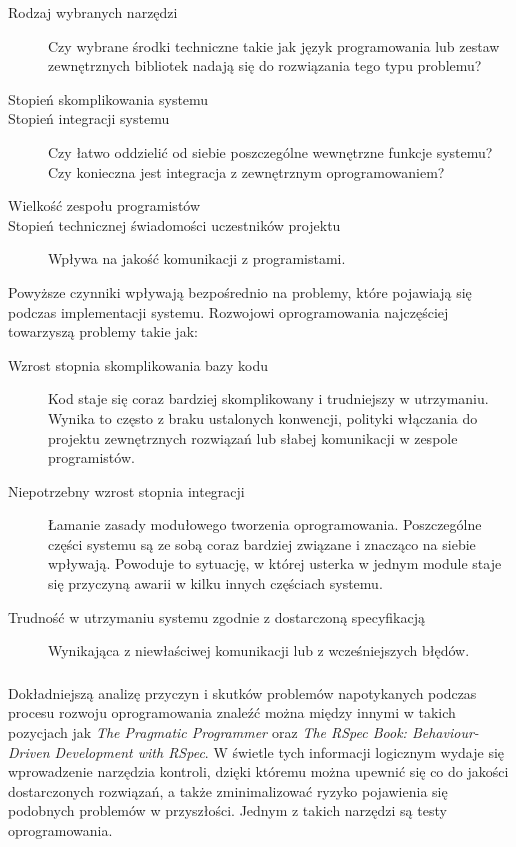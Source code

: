 	  \begin{description}
	    \item[Rodzaj wybranych narzędzi] Czy wybrane środki techniczne takie jak język programowania lub zestaw zewnętrznych bibliotek nadają się do rozwiązania tego typu problemu?
	    \item[Stopień skomplikowania systemu]
	    \item[Stopień integracji systemu] Czy łatwo oddzielić od siebie poszczególne wewnętrzne funkcje systemu? Czy konieczna jest integracja z zewnętrznym oprogramowaniem?
	    \item[Wielkość zespołu programistów]
	    \item[Stopień technicznej świadomości uczestników projektu] Wpływa na jakość komunikacji z programistami.
	  \end{description}
	  
	  Powyższe czynniki wpływają bezpośrednio na problemy, które pojawiają się podczas implementacji systemu. Rozwojowi oprogramowania najczęściej towarzyszą problemy takie jak:
	  
	  \begin{description}
  	  \item[Wzrost stopnia skomplikowania bazy kodu]
  	    Kod staje się coraz bardziej skomplikowany i trudniejszy w utrzymaniu. Wynika to często z braku ustalonych konwencji, polityki włączania do projektu zewnętrznych rozwiązań lub słabej komunikacji w zespole programistów.
  	  \item[Niepotrzebny wzrost stopnia integracji]
  	    Łamanie zasady modułowego tworzenia oprogramowania. Poszczególne części systemu są ze sobą coraz bardziej związane i znacząco na siebie wpływają. Powoduje to sytuację, w której usterka w jednym module staje się przyczyną awarii w kilku innych częściach systemu.
  	  \item[Trudność w utrzymaniu systemu zgodnie z dostarczoną specyfikacją]
  	    Wynikająca z niewłaściwej komunikacji lub z wcześniejszych błędów.
  	\end{description}
	
	\subsubsection{}
	Dokładniejszą analizę przyczyn i skutków problemów napotykanych podczas procesu rozwoju oprogramowania znaleźć można między innymi w takich pozycjach jak \emph{The Pragmatic Programmer \cite{pragmatic_programmer}} oraz \emph{The RSpec Book: Behaviour-Driven Development with RSpec\cite{rspec_book}}.  W świetle tych informacji logicznym wydaje się wprowadzenie narzędzia kontroli, dzięki któremu można upewnić się co do jakości dostarczonych rozwiązań, a także zminimalizować ryzyko pojawienia się podobnych problemów w przyszłości. Jednym z takich narzędzi są testy oprogramowania.
	  
